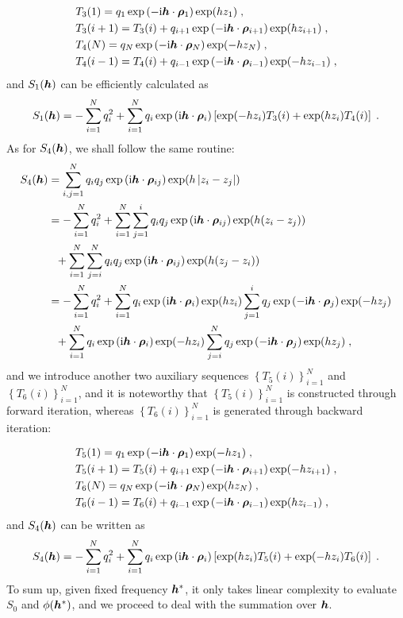 \begin{align*}
    &T_3(1)=q_1\exp{(-\mathrm{i} \boldsymbol{h} \cdot \boldsymbol{\rho}_{1})}\exp(hz_1)\;,\\
    &T_3(i+1)=T_3(i)+q_{i+1}\exp{(-\mathrm{i} \boldsymbol{h} \cdot \boldsymbol{\rho}_{i+1})}\exp(hz_{i+1})\;,\\
    &T_4(N)=q_N\exp{(-\mathrm{i} \boldsymbol{h} \cdot \boldsymbol{\rho}_{N})}\exp(-hz_N)\;,\\
    &T_4(i-1)=T_4(i)+q_{i-1}\exp{(-\mathrm{i} \boldsymbol{h} \cdot \boldsymbol{\rho}_{i-1})}\exp(-hz_{i-1})\;,
\end{align*}
and
$S_1(\boldsymbol{h})$ can be efficiently calculated as
\[
S_1(\boldsymbol{h})= -\sum_{i=1}^Nq_i^2+ \sum_{i=1}^N q_i\exp{(\mathrm{i} \boldsymbol{h} \cdot \boldsymbol{\rho}_{i})}\left[\exp(-hz_i)T_3(i)+\exp(hz_i)T_4(i)\right]\;.
\]
As for $S_4(\boldsymbol{h})$, we shall follow the same routine:
\begin{align*}
S_4(\boldsymbol{h})&=\sum_{i,j=1}^Nq_iq_j  \exp{(\mathrm{i} \boldsymbol{h} \cdot \boldsymbol{\rho}_{ij})}\exp(h\left\lvert z_i-z_j\right\rvert)\\
&=-\sum_{i=1}^Nq_i^2+\sum_{i=1}^N \sum_{j=1}^iq_iq_j  \exp{(\mathrm{i} \boldsymbol{h} \cdot \boldsymbol{\rho}_{ij})}\exp(h(z_i-z_j))\\
&~~+\sum_{i=1}^N \sum_{j=i}^Nq_iq_j  \exp{(\mathrm{i} \boldsymbol{h} \cdot \boldsymbol{\rho}_{ij})}\exp(h(z_j-z_i))\\
&= -\sum_{i=1}^Nq_i^2+\sum_{i=1}^N q_i\exp{(\mathrm{i} \boldsymbol{h} \cdot \boldsymbol{\rho}_{i})}\exp(hz_i)\sum_{j=1}^iq_j\exp{(-\mathrm{i} \boldsymbol{h} \cdot \boldsymbol{\rho}_{j})}\exp(-hz_j)\\
&~~+\sum_{i=1}^N q_i\exp{(\mathrm{i} \boldsymbol{h} \cdot \boldsymbol{\rho}_{i})}\exp(-hz_i)\sum_{j=i}^Nq_j\exp{(-\mathrm{i} \boldsymbol{h} \cdot \boldsymbol{\rho}_{j})}\exp(hz_j)\;,
\end{align*}
and we introduce another two auxiliary sequences  $\left\{T_5(i)\right\}_{i=1}^N$ and $\left\{T_6(i)\right\}_{i=1}^N$, and it is noteworthy that $\left\{T_5(i)\right\}_{i=1}^N$ is  constructed through forward iteration, whereas  $\left\{T_6(i)\right\}_{i=1}^N$   is generated through backward iteration:

\begin{align*}
    &T_5(1)=q_1\exp{(-\mathrm{i} \boldsymbol{h} \cdot \boldsymbol{\rho}_{1})}\exp(-hz_1)\;,\\
    &T_5(i+1)=T_5(i)+q_{i+1}\exp{(-\mathrm{i} \boldsymbol{h} \cdot \boldsymbol{\rho}_{i+1})}\exp(-hz_{i+1})\;,\\
    &T_6(N)=q_N\exp{(-\mathrm{i} \boldsymbol{h} \cdot \boldsymbol{\rho}_{N})}\exp(hz_N)\;,\\
    &T_6(i-1)=T_6(i)+q_{i-1}\exp{(-\mathrm{i} \boldsymbol{h} \cdot \boldsymbol{\rho}_{i-1})}\exp(hz_{i-1})\;,
\end{align*}
and $S_4(\boldsymbol{h})$ can be written as
\[
S_4(\boldsymbol{h})= -\sum_{i=1}^Nq_i^2+ \sum_{i=1}^N q_i\exp{(\mathrm{i} \boldsymbol{h} \cdot \boldsymbol{\rho}_{i})}\left[\exp(hz_i)T_5(i)+\exp(-hz_i)T_6(i)\right]\;.
\]
To sum up, given fixed frequency $\boldsymbol{h}^\ast$, it only takes  linear complexity to evaluate $S_0$ and $\phi(\boldsymbol{h}^\ast)$, and we proceed to deal with the   summation over $\boldsymbol{h}$. 

